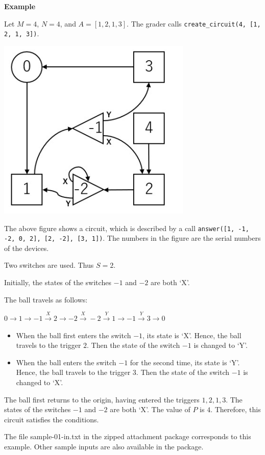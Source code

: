 \textbf{Example}

Let $M=4$, $N=4$, and $A=[1,2,1,3]$. The grader calls \texttt{create\_circuit(4, [1, 2, 1,
3])}.


\includegraphics{4.png}

The above figure shows a circuit, which is described by a call \texttt{answer([1, -1, -2, 0,
2], [2, -2], [3, 1])}. The numbers in the figure are the serial numbers of the
devices.

Two switches are used. Thus $S=2$.

Initially, the states of the switches $-1$ and $-2$ are both `X'.

The ball travels as follows:

$0\rightarrow 1 \rightarrow -1 \stackrel{X}\rightarrow 2 \rightarrow -2 \stackrel{X}\rightarrow -2 \stackrel{Y}\rightarrow 1 \rightarrow -1 \stackrel{Y}\rightarrow 3 \rightarrow 0$ 

\begin{itemize}
    \item When the ball first enters the switch $-1$, its state is `X'. Hence, the ball travels to
the trigger $2$. Then the state of the switch $-1$ is changed to `Y'.
\item When the ball enters the switch $-1$ for the second time, its state is `Y'. Hence, the ball travels to the trigger $3$. Then the state of the switch $-1$ is changed to `X'.
\end{itemize}

The ball first returns to the origin, having entered the triggers $1,2,1,3$. The states of
the switches $-1$ and $-2$ are both `X'. The value of $P$ is $4$. Therefore, this circuit
satisfies the conditions.

The file sample-01-in.txt in the zipped attachment package corresponds to this
example. Other sample inputs are also available in the package.